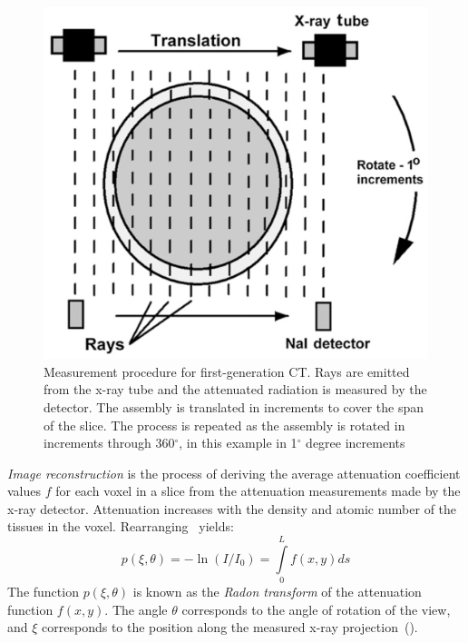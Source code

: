 \begin{figure}[ht]
\centering
		\includegraphics[scale=0.3]{media/0-imaging/ct2.png}
%
\caption{Measurement procedure for first-generation CT. Rays are emitted from the x-ray tube and the attenuated radiation is measured by the detector. The assembly is translated in increments to cover the span of the slice. The process is repeated as the assembly is rotated in increments through 360$^{\circ}$, in this example in 1$^{\circ}$ degree increments~\cite{goldman_2007}}
\label{fig:ct2}
\end{figure}

\textit{Image reconstruction} is the process of deriving the average attenuation coefficient values $f$ for each voxel in a slice from the attenuation measurements made by the x-ray detector. Attenuation increases with the density and atomic number of the tissues in the voxel. Rearranging~ yields:
\begin{equation}
p(\xi, \theta) = -\ln(I/I_0) = \int\limits_{0}^{L}f(x,y) ds
\end{equation}
The function $p(\xi,\theta)$ is known as the \textit{Radon transform} of the attenuation function $f(x,y)$. The angle $\theta$ corresponds to the angle of rotation of the view, and $\xi$ corresponds to the position along the measured x-ray projection~().

